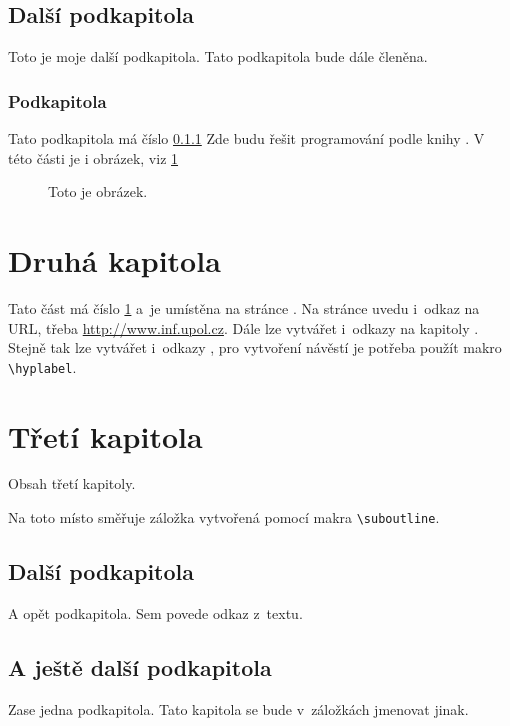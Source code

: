 \documentclass{article}
\begin{document}
\subsection{Další podkapitola}
Toto je moje další podkapitola. Tato podkapitola bude dále členěna.

\subsubsection{Podkapitola}\label{podkapX}
Tato podkapitola má číslo \ref{podkapX} Zde budu řešit programování podle
knihy \cite{kovar}. V této části je i obrázek, viz \ref{obr}

\begin{figure}[ht]
  \centerline{}
  \caption{Toto je obrázek.} \label{obr}
\end{figure}

\newpage
\section{Druhá kapitola}\label{podkapY}
Tato část má číslo \ref{podkapY} a~je umístěna na stránce \pageref{podkapY}.
Na stránce uvedu i~odkaz na URL, třeba \url{http://www.inf.upol.cz}.
Dále lze vytvářet i~odkazy na kapitoly .
Stejně tak lze vytvářet i~odkazy ,
pro vytvoření návěstí je potřeba použít makro \verb|\hyplabel|.

\newpage
\section{Třetí kapitola}
Obsah třetí kapitoly.

\medskip
{}
Na toto místo směřuje záložka vytvořená pomocí makra \verb|\suboutline|.

\subsection{Další podkapitola}
A opět podkapitola. Sem povede odkaz z~textu.

\subsection{A ještě další podkapitola}
Zase jedna podkapitola. Tato kapitola se bude v~záložkách jmenovat jinak.
\end{document}
